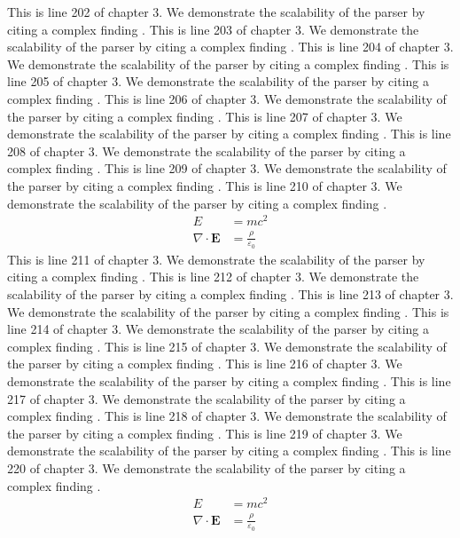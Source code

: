This is line 202 of chapter 3. We demonstrate the scalability of the parser by citing a complex finding \cite{ref3_202}.
This is line 203 of chapter 3. We demonstrate the scalability of the parser by citing a complex finding \cite{ref3_203}.
This is line 204 of chapter 3. We demonstrate the scalability of the parser by citing a complex finding \cite{ref3_204}.
This is line 205 of chapter 3. We demonstrate the scalability of the parser by citing a complex finding \cite{ref3_205}.
This is line 206 of chapter 3. We demonstrate the scalability of the parser by citing a complex finding \cite{ref3_206}.
This is line 207 of chapter 3. We demonstrate the scalability of the parser by citing a complex finding \cite{ref3_207}.
This is line 208 of chapter 3. We demonstrate the scalability of the parser by citing a complex finding \cite{ref3_208}.
This is line 209 of chapter 3. We demonstrate the scalability of the parser by citing a complex finding \cite{ref3_209}.
This is line 210 of chapter 3. We demonstrate the scalability of the parser by citing a complex finding \cite{ref3_210}.
\begin{align*}
  E &= mc^2 \\
  \nabla \cdot \mathbf{E} &= \frac{\rho}{\varepsilon_0}
\end{align*}
This is line 211 of chapter 3. We demonstrate the scalability of the parser by citing a complex finding \cite{ref3_211}.
This is line 212 of chapter 3. We demonstrate the scalability of the parser by citing a complex finding \cite{ref3_212}.
This is line 213 of chapter 3. We demonstrate the scalability of the parser by citing a complex finding \cite{ref3_213}.
This is line 214 of chapter 3. We demonstrate the scalability of the parser by citing a complex finding \cite{ref3_214}.
This is line 215 of chapter 3. We demonstrate the scalability of the parser by citing a complex finding \cite{ref3_215}.
This is line 216 of chapter 3. We demonstrate the scalability of the parser by citing a complex finding \cite{ref3_216}.
This is line 217 of chapter 3. We demonstrate the scalability of the parser by citing a complex finding \cite{ref3_217}.
This is line 218 of chapter 3. We demonstrate the scalability of the parser by citing a complex finding \cite{ref3_218}.
This is line 219 of chapter 3. We demonstrate the scalability of the parser by citing a complex finding \cite{ref3_219}.
This is line 220 of chapter 3. We demonstrate the scalability of the parser by citing a complex finding \cite{ref3_220}.
\begin{align*}
  E &= mc^2 \\
  \nabla \cdot \mathbf{E} &= \frac{\rho}{\varepsilon_0}
\end{align*}
